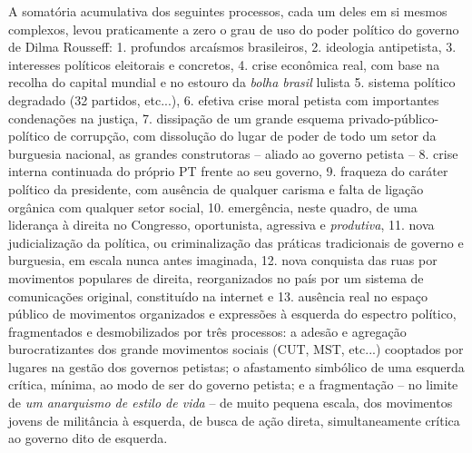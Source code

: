 A somatória acumulativa dos seguintes processos, cada um deles em si
mesmos complexos, levou praticamente a zero o grau de uso do poder
político do governo de Dilma Rousseff: 1. profundos arcaísmos
brasileiros, 2. ideologia antipetista, 3. interesses políticos
eleitorais e concretos, 4. crise econômica real, com base na recolha do
capital mundial e no estouro da \emph{bolha brasil} lulista 5. sistema
político degradado (32 partidos, etc...), 6. efetiva crise moral petista
com importantes condenações na justiça, 7. dissipação de um grande
esquema privado-público-político de corrupção, com dissolução do lugar
de poder de todo um setor da burguesia nacional, as grandes construtoras
-- aliado ao governo petista -- 8. crise interna continuada do próprio
PT frente ao seu governo, 9. fraqueza do caráter político da presidente,
com ausência de qualquer carisma e falta de ligação orgânica com
qualquer setor social, 10. emergência, neste quadro, de uma liderança à
direita no Congresso, oportunista, agressiva e \emph{produtiva}, 11.
nova judicialização da política, ou criminalização das práticas
tradicionais de governo e burguesia, em escala nunca antes imaginada,
12. nova conquista das ruas por movimentos populares de direita,
reorganizados no país por um sistema de comunicações original,
constituído na internet e 13. ausência real no espaço público de
movimentos organizados e expressões à esquerda do espectro político,
fragmentados e desmobilizados por três processos: a adesão e agregação
burocratizantes dos grande movimentos sociais (CUT, MST, etc...)
cooptados por lugares na gestão dos governos petistas; o afastamento
simbólico de uma esquerda crítica, mínima, ao modo de ser do governo
petista; e a fragmentação -- no limite de \emph{um anarquismo de estilo
de vida} -- de muito pequena escala, dos movimentos jovens de militância
à esquerda, de busca de ação direta, simultaneamente crítica ao governo
dito de esquerda.

